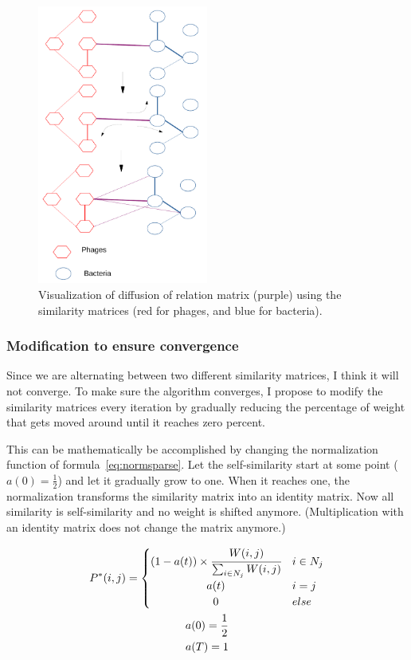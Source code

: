 \documentclass{article}
\begin{document}
\hfill

\begin{figure}[hb]
    \centering
    \includegraphics[width=0.5\textwidth]{img/phage-bac-diffusion_cropped.pdf}
    \caption{Visualization of diffusion of relation matrix (purple) using the similarity matrices (red for phages, and blue for bacteria).}\label{fig:phagediff}
\end{figure}

\subsubsection{Modification to ensure convergence}

Since we are alternating between two different similarity matrices,
I think it will not converge.
To make sure the algorithm converges, I propose to modify the
similarity matrices every iteration by gradually reducing the percentage of weight
that gets moved around until it reaches zero percent.

This can be mathematically be accomplished by changing the normalization
function of formula~\ref{eq:normsparse}.
Let the self-similarity start at some point ($a(0) = \frac{1}{2}$) 
and let it gradually grow to one. 
When it reaches one, the normalization transforms the similarity matrix into
an identity matrix. Now all similarity is self-similarity 
and no weight is shifted anymore. 
(Multiplication with an identity matrix does not change the matrix anymore.)

\begin{equation}
    \begin{gathered}
    P^*(i, j) = 
    \begin{cases}
        (1 - a(t)) \times \cfrac{W(i, j)}{\sum_{i \in N_j}W(i, j)} & i \in N_j \\
        \hfil a(t) & i = j \\
        \hfil 0 & else
    \end{cases} \\
    a(0) = \frac{1}{2} \\
    a(T) = 1
    \end{gathered}
\end{equation}
\end{document}
